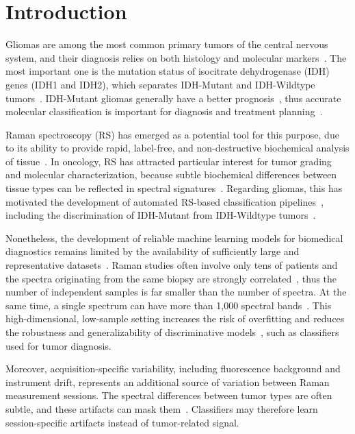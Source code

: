 \documentclass[12pt]{article}
\theoremstyle{paper}
\begin{document}
\section{Introduction}
Gliomas are among the most common primary tumors of the central nervous system, and their diagnosis relies on both histology and molecular markers~\cite{louis2021who}. The most important one is the mutation status of isocitrate dehydrogenase (IDH) genes (IDH1 and IDH2), which separates IDH-Mutant and IDH-Wildtype tumors~\cite{Ceccarelli2016,louis2021who}. IDH-Mutant gliomas generally have a better prognosis~\cite{cancer2015comprehensive,eckel2015glioma}, thus accurate molecular classification is important for diagnosis and treatment planning~\cite{gbm_review_2025}. 

Raman spectroscopy (RS) has emerged as a potential tool for this purpose, due to its ability to provide rapid, label-free, and non-destructive biochemical analysis of tissue~\cite{krafft2009raman}. In oncology, RS has attracted particular interest for tumor grading and molecular characterization, because subtle biochemical differences between tissue types can be reflected in spectral signatures~\cite{bocklitz2016raman}. Regarding gliomas, this has motivated the development of automated RS-based classification pipelines~\cite{stupak2025raman}, including the discrimination of IDH-Mutant from IDH-Wildtype tumors~\cite{apollonov2024raman}.

Nonetheless, the development of reliable machine learning models for biomedical diagnostics remains limited by the availability of sufficiently large and representative datasets~\cite{berisha2021overfitting}. Raman studies often involve only tens of patients and the spectra originating from the same biopsy are strongly correlated~\cite{stupak2025raman,guo2021chemometric}, thus the number of independent samples is far smaller than the number of spectra. At the same time, a single spectrum can have more than 1,000 spectral bands~\cite{stupak2025raman}. This high-dimensional, low-sample setting increases the risk of overfitting and reduces the robustness and generalizability of discriminative models~\cite{berisha2021overfitting,subramanian2013overfitting}, such as classifiers used for tumor diagnosis. 

Moreover, acquisition-specific variability, including fluorescence background and instrument drift, represents an additional source of variation between Raman measurement sessions. The spectral differences between tumor types are often subtle, and these artifacts can mask them~\cite{guo2021chemometric}. Classifiers may therefore learn session-specific artifacts instead of tumor-related signal.
\end{document}
